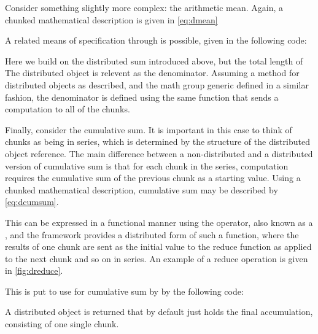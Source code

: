 Consider something slightly more complex: the arithmetic mean.
Again, a chunked mathematical description is given in \cref{eq:dmean}


A related means of specification through \lso is possible, given in the following code:


Here we build on the distributed sum introduced above, but the total length of The distributed object is relevent as the denominator.
Assuming a  method for distributed objects as described, and the math group generic defined in a similar fashion, the denominator is defined using the same  function that sends a  computation to all of the chunks.

Finally, consider the cumulative sum.
It is important in this case to think of chunks as being in series, which is determined by the structure of the distributed object reference.
The main difference between a non-distributed and a distributed version of cumulative sum is that for each chunk in the series, computation requires the cumulative sum of the previous chunk as a starting value.
Using a chunked mathematical description, cumulative sum may be described by \cref{eq:dcumsum}.


This can be expressed in a functional manner using the  operator, also known as a , and the \lso framework provides a distributed form of such a function, where the results of one chunk are sent as the initial value to the reduce function as applied to the next chunk and so on in series.
An example of a reduce operation is given in \cref{fig:dreduce}.


This is put to use for cumulative sum by \lso by the following code:


A distributed object is returned that by default just holds the final accumulation, consisting of one single chunk.
